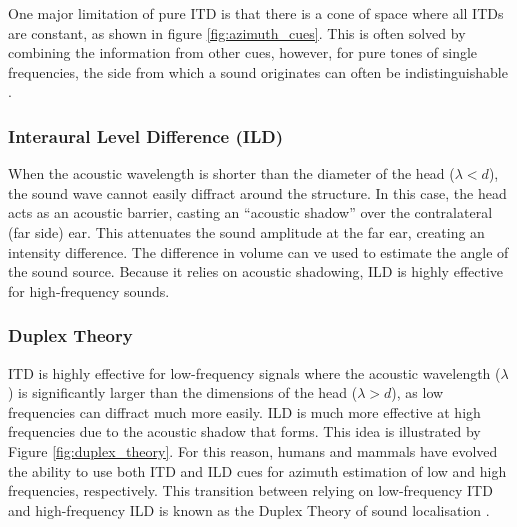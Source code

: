One major limitation of pure ITD is that there is a cone of space where all ITDs are constant, as shown in figure \ref{fig:azimuth_cues}. This is often solved by combining the information from other cues, however, for pure tones of single frequencies, the side from which a sound originates can often be indistinguishable \cite{Rayleigh1907Direction}.

\subsubsection{Interaural Level Difference (ILD)} 
When the acoustic wavelength is shorter than the diameter of the head ($\lambda < d$), the sound wave cannot easily diffract around the structure. In this case, the head acts as an acoustic barrier, casting an ``acoustic shadow'' over the contralateral (far side) ear. This attenuates the sound amplitude at the far ear, creating an intensity difference. The difference in volume can ve used to estimate the angle of the sound source. Because it relies on acoustic shadowing, ILD is highly effective for high-frequency sounds. 

\subsubsection{Duplex Theory}
    
ITD is highly effective for low-frequency signals where the acoustic wavelength ($\lambda$) is significantly larger than the dimensions of the head ($\lambda > d$), as low frequencies can diffract much more easily. ILD is much more effective at high frequencies due to the acoustic shadow that forms. This idea is illustrated by Figure \ref{fig:duplex_theory}. For this reason, humans and mammals have evolved the ability to use both ITD and ILD cues for azimuth estimation of low and high frequencies, respectively. This transition between relying on low-frequency ITD and high-frequency ILD is known as the Duplex Theory of sound localisation \cite{Rayleigh1907Direction}. 

